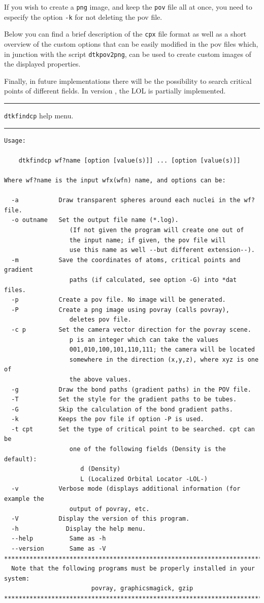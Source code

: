 If you wish to create a \texttt{png} image, and keep the \texttt{pov} file all at once, you need to especify the option \texttt{-k} for not deleting the pov file.

Below you can find a brief description of the \texttt{cpx} file format as well as a short overview of the custom options that can be easily modified in the pov files which, in junction with the script \texttt{dtkpov2png}, can  be used to create custom images of the displayed properties.

Finally, in future implementations there will be the possibility to search critical points of different fields. In version \dtkversion, the LOL is partially implemented. 


\rule{\textwidth}{1pt}
{\center\texttt{dtkfindcp} help menu.\\}
\rule{\textwidth}{1pt}
\begin{footnotesize}
\begin{verbatim}
Usage:

	dtkfindcp wf?name [option [value(s)]] ... [option [value(s)]]

Where wf?name is the input wfx(wfn) name, and options can be:

  -a           Draw transparent spheres around each nuclei in the wf? file.
  -o outname   Set the output file name (*.log).
                  (If not given the program will create one out of
                  the input name; if given, the pov file will
                  use this name as well --but different extension--).
  -m           Save the coordinates of atoms, critical points and gradient
                  paths (if calculated, see option -G) into *dat files.
  -p           Create a pov file. No image will be generated.
  -P           Create a png image using povray (calls povray),
                  deletes pov file.
  -c p         Set the camera vector direction for the povray scene.
                  p is an integer which can take the values
                  001,010,100,101,110,111; the camera will be located
                  somewhere in the direction (x,y,z), where xyz is one of 
                  the above values.
  -g           Draw the bond paths (gradient paths) in the POV file.
  -T           Set the style for the gradient paths to be tubes.
  -G           Skip the calculation of the bond gradient paths.
  -k           Keeps the pov file if option -P is used.
  -t cpt       Set the type of critical point to be searched. cpt can be 
                  one of the following fields (Density is the default):
                     d (Density)
                     L (Localized Orbital Locator -LOL-)
  -v           Verbose mode (displays additional information (for example the 
                  output of povray, etc.
  -V           Display the version of this program.
  -h	         Display the help menu.
  --help          Same as -h
  --version       Same as -V
********************************************************************************
  Note that the following programs must be properly installed in your system:
                        povray, graphicsmagick, gzip
********************************************************************************
\end{verbatim}
\end{footnotesize}
